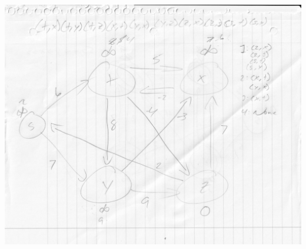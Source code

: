 \documentclass[12pt]{article}
\begin{document}
\begin{enumerate}
\includegraphics[scale=.32]{24.1-1 Vertex Z/24.1-1Z.jpg}


\end{enumerate}
\end{document}
